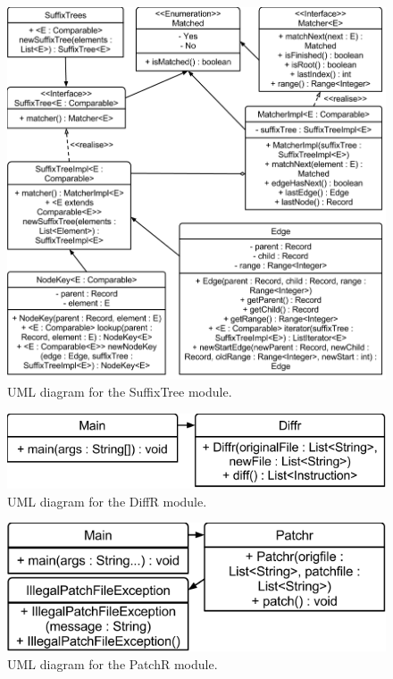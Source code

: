 \begin{figure}[H]
\begin{center}
\includegraphics[width=\textwidth]{design/diffrUML-suffixtree.png}
\end{center}
\caption{UML diagram for the SuffixTree module.}
\label{fig:suffixTreeUML}
\end{figure}

\begin{figure}[H]
\begin{center}
\includegraphics[width=\textwidth]{design/diffrUML-diffR.png}
\end{center}
\caption{UML diagram for the DiffR module.}
\label{fig:diffrUML}
\end{figure}

\begin{figure}[H]
\begin{center}
\includegraphics[width=\textwidth]{design/diffrUML-patchR.png}
\end{center}
\caption{UML diagram for the PatchR module.}
\label{fig:patchrUML}
\end{figure}

